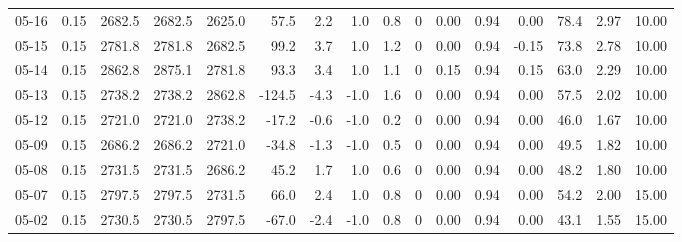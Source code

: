 \begin{threeparttable}
{\begin{tabular}{lrrrrrrrrrrrrrrr}
  05-16 &     0.15 & 2682.5 & 2682.5 & 2625.0 &       57.5 &            2.2 &                      1.0 &                 0.8 &              0 &       0.00 &      0.94 &           0.00 &             78.4 &            2.97 &                  10.00 \\
  05-15 &     0.15 & 2781.8 & 2781.8 & 2682.5 &       99.2 &            3.7 &                      1.0 &                 1.2 &              0 &       0.00 &      0.94 &          -0.15 &             73.8 &            2.78 &                  10.00 \\
  05-14 &     0.15 & 2862.8 & 2875.1 & 2781.8 &       93.3 &            3.4 &                      1.0 &                 1.1 &              0 &       0.15 &      0.94 &           0.15 &             63.0 &            2.29 &                  10.00 \\
  05-13 &     0.15 & 2738.2 & 2738.2 & 2862.8 &     -124.5 &           -4.3 &                     -1.0 &                 1.6 &              0 &       0.00 &      0.94 &           0.00 &             57.5 &            2.02 &                  10.00 \\
  05-12 &     0.15 & 2721.0 & 2721.0 & 2738.2 &      -17.2 &           -0.6 &                     -1.0 &                 0.2 &              0 &       0.00 &      0.94 &           0.00 &             46.0 &            1.67 &                  10.00 \\
  05-09 &     0.15 & 2686.2 & 2686.2 & 2721.0 &      -34.8 &           -1.3 &                     -1.0 &                 0.5 &              0 &       0.00 &      0.94 &           0.00 &             49.5 &            1.82 &                  10.00 \\
  05-08 &     0.15 & 2731.5 & 2731.5 & 2686.2 &       45.2 &            1.7 &                      1.0 &                 0.6 &              0 &       0.00 &      0.94 &           0.00 &             48.2 &            1.80 &                  10.00 \\
  05-07 &     0.15 & 2797.5 & 2797.5 & 2731.5 &       66.0 &            2.4 &                      1.0 &                 0.8 &              0 &       0.00 &      0.94 &           0.00 &             54.2 &            2.00 &                  15.00 \\
  05-02 &     0.15 & 2730.5 & 2730.5 & 2797.5 &      -67.0 &           -2.4 &                     -1.0 &                 0.8 &              0 &       0.00 &      0.94 &           0.00 &             43.1 &            1.55 &                  15.00 \\

\end{tabular}}
\end{threeparttable}
